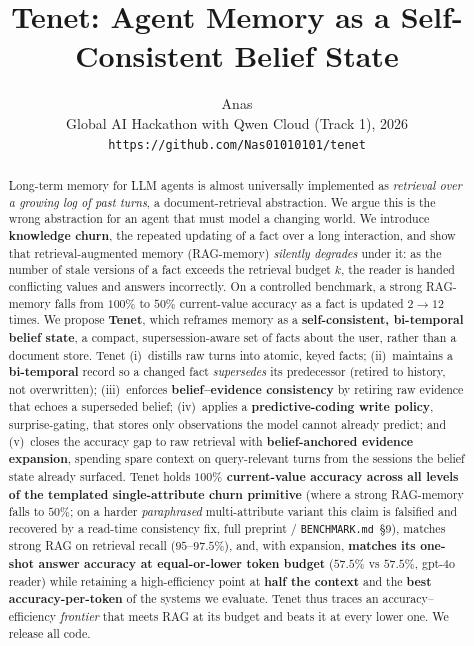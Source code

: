 \documentclass[11pt]{article}
\title{\textbf{Tenet: Agent Memory as a Self-Consistent Belief State}}
\author{Anas\\\small Global AI Hackathon with Qwen Cloud (Track 1), 2026\\
\small\texttt{https://github.com/Nas01010101/tenet}}
\date{}
\begin{document}
\maketitle

\begin{abstract}
\noindent Long-term memory for LLM agents is almost universally implemented as
\emph{retrieval over a growing log of past turns}, a document-retrieval abstraction. We
argue this is the wrong abstraction for an agent that must model a changing world. We
introduce \textbf{knowledge churn}, the repeated updating of a fact over a long
interaction, and show that retrieval-augmented memory (RAG-memory) \emph{silently
degrades} under it: as the number of stale versions of a fact exceeds the retrieval budget
$k$, the reader is handed conflicting values and answers incorrectly. On a controlled
benchmark, a strong RAG-memory falls from $100\%$ to $50\%$ current-value accuracy as a
fact is updated $2\!\to\!12$ times. We propose \textbf{Tenet}, which reframes memory as a
\textbf{self-consistent, bi-temporal belief state}, a compact, supersession-aware set of
facts about the user, rather than a document store. Tenet (i)~distills raw turns into atomic, keyed facts; (ii)~maintains
a \textbf{bi-temporal} record so a changed fact \emph{supersedes} its predecessor (retired
to history, not overwritten); (iii)~enforces \textbf{belief--evidence consistency} by
retiring raw evidence that echoes a superseded belief; (iv)~applies a
\textbf{predictive-coding write policy}, surprise-gating, that stores only observations the
model cannot already predict; and (v)~closes the accuracy gap to raw retrieval with
\textbf{belief-anchored evidence expansion}, spending spare context on query-relevant turns
from the sessions the belief state already surfaced. Tenet holds \textbf{$100\%$ current-value
accuracy across all levels of the templated single-attribute churn primitive} (where a strong
RAG-memory falls to $50\%$; on a harder \emph{paraphrased} multi-attribute variant this claim
is falsified and recovered by a read-time consistency fix, full preprint / \texttt{BENCHMARK.md}~\S9),
matches strong
RAG on retrieval recall ($95$--$97.5\%$), and, with expansion, \textbf{matches its one-shot
answer accuracy at equal-or-lower token budget} ($57.5\%$ vs $57.5\%$, gpt-4o reader) while
retaining a high-efficiency point at \textbf{half the context} and the \textbf{best
accuracy-per-token} of the systems we evaluate. Tenet thus traces an accuracy--efficiency
\emph{frontier} that meets RAG at its budget and beats it at every lower one. We release all code.
\end{abstract}
\end{document}
